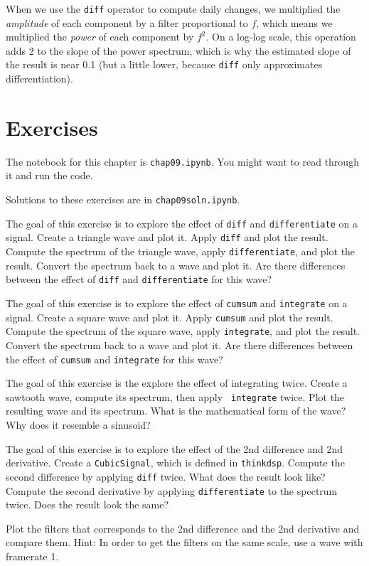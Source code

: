 When we use the {\tt diff} operator to compute daily changes, we
multiplied the {\em amplitude} of each component by a filter proportional to
$f$, which means we multiplied the {\em power} of each component by $f^2$.
On a log-log scale, this operation adds 2 to the slope of the
power spectrum, which is why the estimated slope of the result
is near 0.1 (but a little lower, because {\tt diff} only approximates
differentiation).



\section{Exercises}

The notebook for this chapter is {\tt chap09.ipynb}.
You might want to read through it and run the code.

Solutions to these exercises are in {\tt chap09soln.ipynb}.

\begin{exercise}
	The goal of this exercise is to explore the effect of {\tt diff} and
	{\tt differentiate} on a signal. Create a triangle wave and plot
	it. Apply {\tt diff} and plot the result. Compute the spectrum of the
	triangle wave, apply {\tt differentiate}, and plot the result. Convert
	the spectrum back to a wave and plot it. Are there differences between
	the effect of {\tt diff} and {\tt differentiate} for this wave?
\end{exercise}

\begin{exercise}
	The goal of this exercise is to explore the effect of {\tt cumsum} and
	{\tt integrate} on a signal. Create a square wave and plot it. Apply
	{\tt cumsum} and plot the result. Compute the spectrum of the square
	wave, apply {\tt integrate}, and plot the result. Convert the spectrum
	back to a wave and plot it. Are there differences between the effect
	of {\tt cumsum} and {\tt integrate} for this wave?
\end{exercise}

\begin{exercise}
	The goal of this exercise is the explore the effect of integrating
	twice. Create a sawtooth wave, compute its spectrum, then apply {\tt
		integrate} twice. Plot the resulting wave and its spectrum. What is
	the mathematical form of the wave? Why does it resemble a sinusoid?
\end{exercise}

\begin{exercise}
	The goal of this exercise is to explore the effect of the 2nd
	difference and 2nd derivative. Create a {\tt CubicSignal}, which is
	defined in {\tt thinkdsp}. Compute the second difference by applying
	{\tt diff} twice. What does the result look like?  Compute the second
	derivative by applying {\tt differentiate} to the spectrum twice.
	Does the result look the same?
	
	Plot the filters that corresponds to the 2nd difference and the 2nd
	derivative and compare them. Hint: In order to get the filters on the
	same scale, use a wave with framerate 1.
\end{exercise}